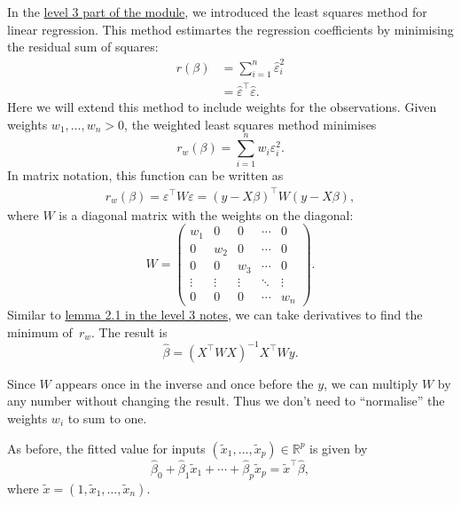 \documentclass[
  a4paper,
]{article}
\theoremstyle{definition}
\theoremstyle{definition}
\theoremstyle{definition}
\theoremstyle{definition}
\theoremstyle{remark}
\begin{document}
In the \href{https://seehuhn.github.io/MATH3714/S02-multiple.html\#the-normal-equations}{level 3 part of the module},
we introduced the least squares method for linear regression. This method
estimartes the regression coefficients by minimising the residual sum of
squares:
\begin{align*}
  r(\beta)
  &= \sum_{i=1}^n \hat\varepsilon_i^2 \\
  &= \hat\varepsilon^\top \hat\varepsilon.
\end{align*}
Here we will extend this method to include weights for the observations.
Given weights
\(w_1, \ldots, w_n > 0\), the weighted least squares method minimises
\begin{equation*}
  r_w(\beta)
  = \sum_{i=1}^n w_i \varepsilon_i^2.
\end{equation*}
In matrix notation, this function can be written as
\begin{align*}
  r_w(\beta)
  = \varepsilon^\top W \varepsilon
  = (y - X \beta)^\top W (y - X \beta),
\end{align*}
where \(W\) is a diagonal matrix with the weights on the diagonal:
\begin{equation}
  W
  = \begin{pmatrix}
      w_1 & 0 & 0 & \cdots & 0 \\
      0 & w_2 & 0 & \cdots & 0 \\
      0 & 0 & w_3 & \cdots & 0 \\
      \vdots & \vdots & \vdots & \ddots & \vdots \\
      0 & 0 & 0 & \cdots & w_n
    \end{pmatrix}.  \label{eq:W-diagonal}
\end{equation}
Similar to \href{https://seehuhn.github.io/MATH3714/S02-multiple.html\#lem:multiple-LSQ}{lemma 2.1 in the level 3 notes},
we can take derivatives to find
the minimum of~\(r_w\). The result is
\begin{equation*}
  \hat\beta
  = (X^\top W X)^{-1} X^\top W y.
\end{equation*}

Since \(W\) appears once in the inverse and once before the \(y\), we can
multiply \(W\) by any number without changing the result. Thus we don't
need to ``normalise'' the weights \(w_i\) to sum to one.

As before, the fitted value for inputs \((\tilde x_1, \ldots, \tilde x_p) \in \mathbb{R}^p\) is given by
\begin{equation*}
  \hat\beta_0 + \hat\beta_1 \tilde x_1 + \cdots + \hat\beta_p \tilde x_p
  = \tilde x^\top \hat\beta,
\end{equation*}
where \(\tilde x = (1, \tilde x_1, \ldots, \tilde x_n)\).
\end{document}
